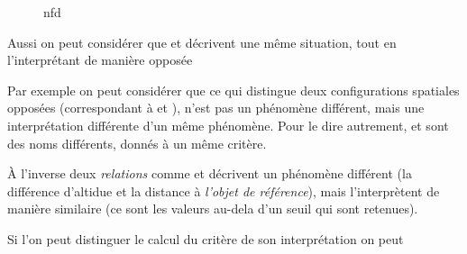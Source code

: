 \begin{figure}
  \centering
  
  \caption{nfd}
  \label{fig:ds}
\end{figure}

%
Aussi on peut considérer que  et  décrivent une même situation, tout en l'interprétant de manière opposée

Par exemple on peut considérer que ce qui distingue deux configurations spatiales opposées (\eg correspondant à  et ), n'est pas un phénomène différent, mais une interprétation différente d'un même phénomène. Pour le dire autrement,  et  sont des noms différents, donnés à un même critère.

À l'inverse deux \emph{relations} comme  et  décrivent un phénomène différent (\ie la différence d'altidue et la distance à \emph{l'objet de référence}), mais l’interprètent de manière similaire (ce sont les valeurs au-dela d'un seuil qui sont retenues).

%
Si l'on peut distinguer le calcul du critère de son interprétation on peut

